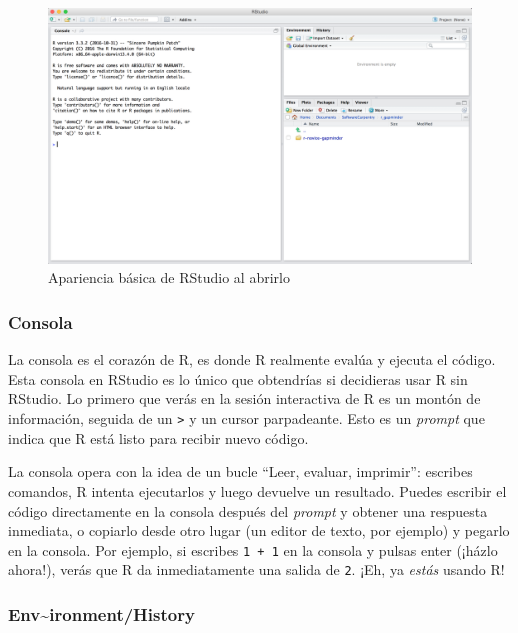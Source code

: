\documentclass[
  letterpaper,
  DIV=11,
  numbers=noendperiod]{scrreprt}
\begin{document}
\begin{figure}

{\centering \includegraphics[width=8.53in,height=\textheight]{images/01-intro-r/01_rstudio.png}

}

\caption{Apariencia básica de RStudio al abrirlo}

\end{figure}

\hypertarget{consola}{%
\subsubsection{Consola}\label{consola}}

La consola es el corazón de R, es donde R realmente evalúa y ejecuta el
código. Esta consola en RStudio es lo único que obtendrías si decidieras
usar R sin RStudio. Lo primero que verás en la sesión interactiva de R
es un montón de información, seguida de un \texttt{\textgreater{}} y un
cursor parpadeante. Esto es un \emph{prompt} que indica que R está listo
para recibir nuevo código.

La consola opera con la idea de un bucle ``Leer, evaluar, imprimir'':
escribes comandos, R intenta ejecutarlos y luego devuelve un resultado.
Puedes escribir el código directamente en la consola después del
\emph{prompt} y obtener una respuesta inmediata, o copiarlo desde otro
lugar (un editor de texto, por ejemplo) y pegarlo en la consola. Por
ejemplo, si escribes \texttt{1\ +\ 1} en la consola y pulsas enter
(¡házlo ahora!), verás que R da inmediatamente una salida de \texttt{2}.
¡Eh, ya \emph{estás} usando R!

\hypertarget{environmenthistory}{%
\subsubsection{Env\textasciitilde ironment/History}\label{environmenthistory}}
\end{document}
